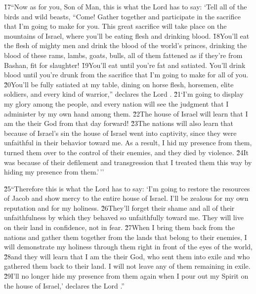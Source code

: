 \v{17}``Now as for you, Son of Man, this is what the Lord  has to say: `Tell all of the birds and wild beasts, ``Come! Gather together and participate in the sacrifice that I'm going to make for you. This great sacrifice will take place on the mountains of Israel, where you'll be eating flesh and drinking blood. \v{18}You'll eat the flesh of mighty men and drink the blood of the world's princes, drinking the blood of these rams, lambs, goats, bulls, all of them fattened as if they're from Bashan, fit for slaughter! \v{19}You'll eat until you're fat and satiated. You'll drink blood until you're drunk from the sacrifice that I'm going to make for all of you. \v{20}You'll be fully satiated at my table, dining on horse flesh, horsemen, elite soldiers, and every kind of warrior,'' declares the Lord . \v{21}`I'm going to display my glory among the people, and every nation will see the judgment that I administer by my own hand among them. \v{22}The house of Israel will learn that I am the  their God from that day forward! \v{23}The nations will also learn that because of Israel's sin the house of Israel went into captivity, since they were unfaithful in their behavior toward me. As a result, I hid my presence from them, turned them over to the control of their enemies, and they died by violence. \v{24}It was because of their defilement and transgression that I treated them this way by hiding my presence from them.'\,''

\v{25}``Therefore this is what the Lord  has to say: `I'm going to restore the resources of Jacob and show mercy to the entire house of Israel. I'll be zealous for my own reputation and for my holiness. \v{26}They'll forget their shame and all of their unfaithfulness by which they behaved so unfaithfully toward me. They will live on their land in confidence, not in fear. \v{27}When I bring them back from the nations and gather them together from the lands that belong to their enemies, I will demonstrate my holiness through them right in front of the eyes of the world, \v{28}and they will learn that I am the  their God, who sent them into exile and who gathered them back to their land. I will not leave any of them remaining in exile. \v{29}I'll no longer hide my presence from them again when I pour out my Spirit on the house of Israel,' declares the Lord .''

